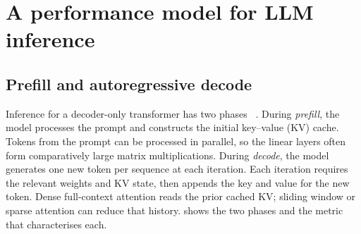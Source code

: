 
\section{A performance model for LLM inference}
\label{sec:inference-model}

\subsection{Prefill and autoregressive decode}

Inference for a decoder-only transformer has two phases
~\cite{na2024llmcpu}.  During
\emph{prefill}, the model processes the prompt and constructs the
initial key--value (KV) cache.  Tokens from the prompt can be processed
in parallel, so the linear layers often form comparatively large matrix
multiplications.  During \emph{decode}, the model generates one new
token per sequence at each iteration.  Each iteration requires the
relevant weights and KV state, then appends the key and value for the new
token.  Dense full-context attention reads the prior cached KV; sliding
window or sparse attention can reduce that history.
 shows the two phases and the metric that
characterises each.

